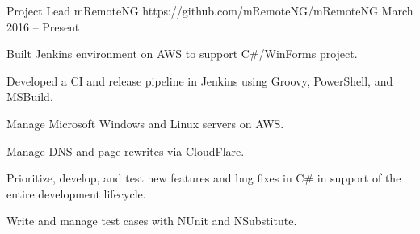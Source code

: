 \cventry
{Project Lead} %
{mRemoteNG} %
{https://github.com/mRemoteNG/mRemoteNG} %
{March 2016 – Present} %
{
  	\begin{cvitems} %
        \item {Built Jenkins environment on AWS to support C\#/WinForms project.}
		\item {Developed a CI and release pipeline in Jenkins using Groovy, PowerShell, and MSBuild.}
		\item {Manage Microsoft Windows and Linux servers on AWS.}
		\item {Manage DNS and page rewrites via CloudFlare.}
		\item {Prioritize, develop, and test new features and bug fixes in C\# in support of the entire development lifecycle.}
		\item {Write and manage test cases with NUnit and NSubstitute.}
	\end{cvitems}
}